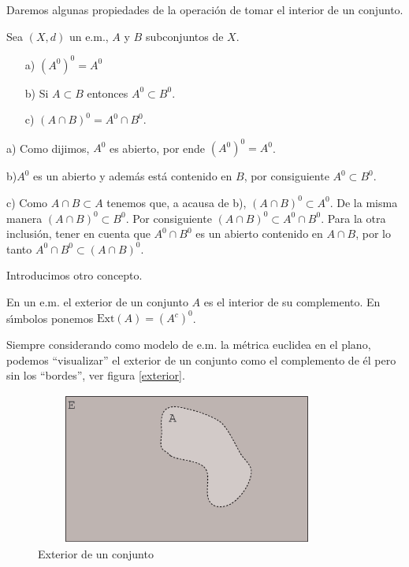 Daremos algunas propiedades de la operaci\'on de tomar el interior
de un conjunto.
\begin{teorema} Sea $(X,d)$ un e.m., $A$ y $B$ subconjuntos de
$X$.
\begin{itemize}
\item[a)] $(A^0)^0=A^0$
\item[b)] Si $A\subset B$ entonces $A^0\subset B^0$.
\item[c)] $(A\cap B)^0=A^0\cap B^0$.
\end{itemize}
\end{teorema}
\begin{demo} a) Como dijimos, $A^0$ es abierto, por ende
$(A^0)^0=A^0$.

b)$A^0$ es un abierto y adem\'as est\'a contenido en $B$, por
consiguiente $A^0\subset B^0$.

c) Como $A\cap B\subset A$ tenemos que, a acausa de b), $(A\cap
B)^0\subset A^0$. De la misma manera $(A\cap B)^0\subset B^0$. Por
consiguiente $(A\cap B)^0\subset A^0\cap B^0$. Para la otra
inclusi\'on, tener en cuenta que $A^0\cap B^0$ es un abierto
contenido en $A\cap B$, por lo tanto $A^0\cap B^0\subset (A\cap
B)^0$.
\end{demo}
 Introducimos otro concepto.

\begin{definicion} En un e.m. el exterior de un conjunto $A$ es el
interior de su complemento. En s\'{\i}mbolos ponemos
$\text{Ext}(A)=(A^c)^0$.
\end{definicion}
Siempre considerando como modelo de e.m. la m\'etrica euclidea en
el plano, podemos ``visualizar'' el exterior de un conjunto como
el complemento de \'el pero sin los ``bordes'', ver figura
\vref{exterior}.
\begin{figure}
\begin{center}
	\includegraphics[height=5cm, width=10cm]{exterio.eps}
	\caption{Exterior de un conjunto}\label{exterior}
\end{center}
\end{figure}

